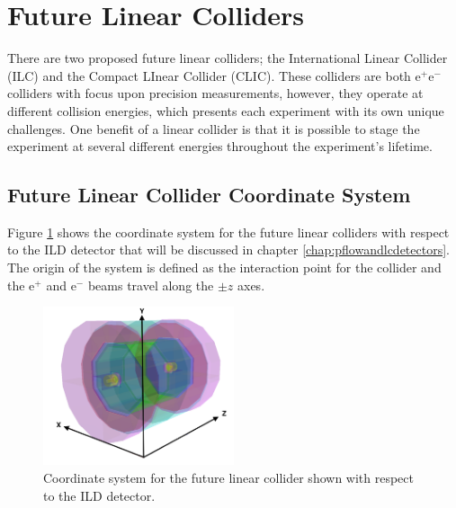 
\section{Future Linear Colliders}
There are two proposed future linear colliders; the International Linear Collider (ILC) and the Compact LInear Collider (CLIC).  These colliders are both $\text{e}^{+}\text{e}^{-}$ colliders with focus upon precision measurements, however, they operate at different collision energies, which presents each experiment with its own unique challenges.  One benefit of a linear collider is that it is possible to stage the experiment at several different energies throughout the {experiment's lifetime.}


\subsection{Future Linear Collider Coordinate System}

{Figure \ref{fig:coordinates} shows the coordinate system for the future linear colliders with respect to the ILD detector that will be discussed in chapter \ref{chap:pflowandlcdetectors}.  The origin of the system is defined as the interaction point for the collider and the $\text{e}^{+}$ and $\text{e}^{-}$ beams travel along the $\pm z$ axes.}

\begin{figure}[h!]
\includegraphics[width=0.5\textwidth]{Introduction/Plots/CoordinateSystem.png}
\caption[Coordinate system for the future linear collider shown with respect to the ILD detector.]{Coordinate system for the future linear collider shown with respect to the ILD detector.}
\label{fig:coordinates}
\end{figure}

